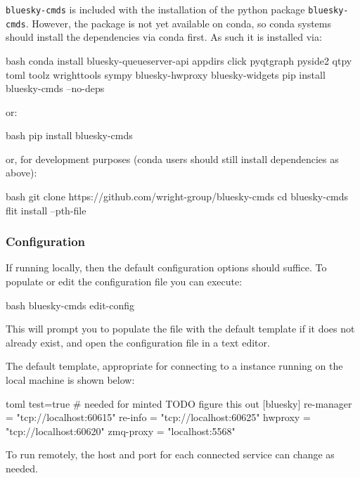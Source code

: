 \texttt{bluesky-cmds} is included with the installation of the python package \texttt{bluesky-cmds}.
However, the package is not yet available on conda, so conda systems should install the dependencies via conda first.
As such it is installed via:

\begin{codefragment}{bash}
conda install bluesky-queueserver-api appdirs click pyqtgraph pyside2 qtpy toml toolz wrighttools sympy bluesky-hwproxy bluesky-widgets
pip install bluesky-cmds --no-deps
\end{codefragment}

or:

\begin{codefragment}{bash}
pip install bluesky-cmds
\end{codefragment}

or, for development purposes (conda users should still install dependencies as above):

\begin{codefragment}{bash}
git clone https://github.com/wright-group/bluesky-cmds
cd bluesky-cmds
flit install --pth-file
\end{codefragment}

\subsubsection{Configuration}

If running locally, then the default configuration options should suffice.
To populate or edit the configuration file you can execute:

\begin{codefragment}{bash}
bluesky-cmds edit-config
\end{codefragment}

This will prompt you to populate the file with the default template if it does not already exist, and open the configuration file in a text editor.

The default template, appropriate for connecting to a \biab instance running on the local machine is shown below:

\begin{codefragment}{toml}
test=true # needed for minted TODO figure this out
[bluesky]
re-manager = "tcp://localhost:60615"
re-info = "tcp://localhost:60625"
hwproxy = "tcp://localhost:60620"
zmq-proxy = "localhost:5568"
\end{codefragment}

To run remotely, the host and port for each connected service can change as needed.

